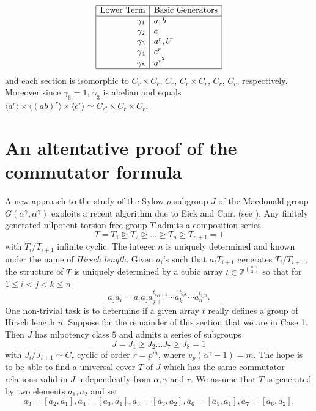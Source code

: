 \documentclass{amsart}
\theoremstyle{definition}
\theoremstyle{remark}
\newcommand \Z{{\mathbb Z}}
\begin{document}
{$$
\begin{array}{|r|l|}
  \hline
  \text{Lower Term}&\text{Basic Generators}\\
  \hline
  \gamma_1 & a,b \\
  \gamma_2 & c \\
  \gamma_3 & a^r,b^r \\
  \gamma_4 & c^r \\
  \gamma_5 & a^{r^2}\\
  \hline
\end{array}
$$
and each section is isomorphic to $C_r\times C_r$, $C_r$, $C_r\times C_r$, $C_r$, $C_r$, respectively. Moreover since $\gamma_6=1$, $\gamma_3$ is abelian and equals 
$
\langle a^r\rangle\times \langle (ab)^r\rangle \times \langle c^r\rangle\simeq C_{r^2}\times C_r\times C_r.
$

\section{An altentative proof of the commutator formula}\label{andrea}

A new approach to the study of the Sylow $p$-subgroup $J$ of the Macdonald group $G(\alpha^\gamma,\alpha^\gamma)$ exploits 
a recent algorithm due to Eick and Cant (see \cite{CE}). Any finitely generated nilpotent torsion-free group $T$
admits a composition series 
$$
T=T_1\unrhd T_2\unrhd \ldots\unrhd T_n \unrhd T_{n+1}=1
$$
with $T_i/T_{i+1}$ infinite cyclic. The integer $n$ is uniquely determined and known under the name of \emph{Hirsch length}.
Given $a_i$'s such that $a_iT_{i+1}$ generates $T_i/T_{i+1}$, the structure of $T$ is uniquely determined by a cubic array 
$t\in \Z^{\binom{n}{3}}$ so that for $1\le i<j<k\le n$
$$
a_ja_i=a_ia_ja_{j+1}^{t_{ijj+1}}\cdots a_k^{t_{ijk}}\cdots a_n^{t_{ijn}}.
$$
One non-trivial task is to determine if a given array $t$ really defines a group of Hirsch length $n$.
Suppose for the remainder of this section that we are in Case 1. Then $J$ has nilpotency class $5$ and admits a series of subgroups
$$
J=J_1\unrhd J_2\ldots J_7\unrhd J_8=1
$$
with $J_i/J_{i+1}\simeq C_r$ cyclic of order $r=p^m$, where $v_p(\alpha^\gamma-1)=m$.
The hope is to be able to find a universal cover $T$ of $J$ which has the same commutator relations valid in $J$ independently from 
$\alpha,\gamma$ and $r$. We assume that $T$ is generated by two elements $a_1,a_2$ and set 
\begin{equation}\label{DefElts}
a_3=[a_2,a_1], a_4=[a_3,a_1], a_5=[a_3,a_2], a_6=[a_5,a_1], a_7=[a_6,a_2].
\end{equation}

}
\end{document}

